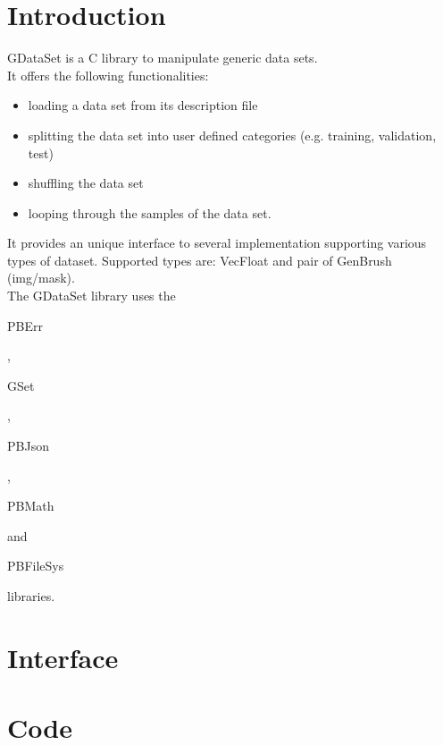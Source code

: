 \section*{Introduction}

GDataSet is a C library to manipulate generic data sets.\\

It offers the following functionalities:\\
\begin{itemize}
\item loading a data set from its description file
\item splitting the data set into user defined categories (e.g. training, validation, test)
\item shuffling the data set
\item looping through the samples of the data set. 
\end{itemize}

It provides an unique interface to several implementation supporting various types of dataset. Supported types are: VecFloat and pair of GenBrush (img/mask).\\

The GDataSet library uses the \begin{ttfamily}PBErr\end{ttfamily}, \begin{ttfamily}GSet\end{ttfamily}, \begin{ttfamily}PBJson\end{ttfamily}, \begin{ttfamily}PBMath\end{ttfamily} and \begin{ttfamily}PBFileSys\end{ttfamily} libraries.\\

\section{Interface}

\begin{scriptsize}
\begin{ttfamily}

\end{ttfamily}
\end{scriptsize}

\section{Code}

